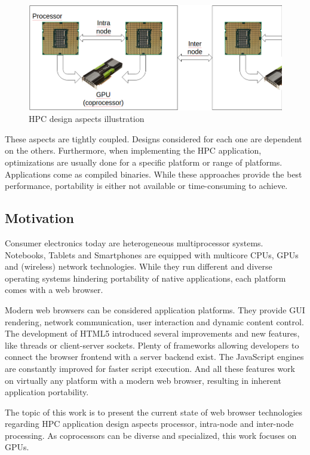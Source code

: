 \begin{figure}[htp]
  \begin{center}
    \includegraphics[width=0.9\columnwidth]{resources/hpc_aspects.png}
  \end{center}
  \caption{HPC design aspects illustration}
  \label{fig:hpcaspects}
\end{figure}

These aspects are tightly coupled. Designs considered for each one are dependent on the others. Furthermore, when implementing the HPC application, optimizations are usually done for a specific platform or range of platforms. Applications come as compiled binaries. While these approaches provide the best performance, portability is either not available or time-consuming to achieve.


\subsection{Motivation}

Consumer electronics today are heterogeneous multiprocessor systems. Notebooks, Tablets and Smartphones are equipped with multicore CPUs, GPUs and (wireless) network technologies. While they run different and diverse operating systems hindering portability of native applications, each platform comes with a web browser.

Modern web browsers can be considered application platforms. They provide GUI rendering, network communication, user interaction and dynamic content control. The development of HTML5 introduced several improvements and new features, like threads or client-server sockets. Plenty of frameworks allowing developers to connect the browser frontend with a server backend exist. The JavaScript engines are constantly improved for faster script execution. And all these features work on virtually any platform with a modern web browser, resulting in inherent application portability.

The topic of this work is to present the current state of web browser technologies regarding HPC application design aspects processor, intra-node and inter-node processing. As coprocessors can be diverse and specialized, this work focuses on GPUs.


